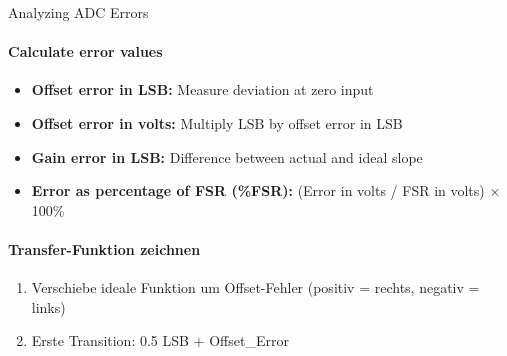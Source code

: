 \begin{KR}{Analyzing ADC Errors}
\paragraph{Calculate error values}
\begin{itemize}
    \item \textbf{Offset error in LSB:} Measure deviation at zero input
    \item \textbf{Offset error in volts:} Multiply LSB by offset error in LSB
    \item \textbf{Gain error in LSB:} Difference between actual and ideal slope
    \item \textbf{Error as percentage of FSR (\%FSR):} (Error in volts / FSR in volts) × 100\%
\end{itemize}

\paragraph{Transfer-Funktion zeichnen}
    \begin{enumerate}
        \item Verschiebe ideale Funktion um Offset-Fehler (positiv = rechts, negativ = links)
        \item Erste Transition: 0.5 LSB + Offset\_Error
    \end{enumerate}
\end{KR}

